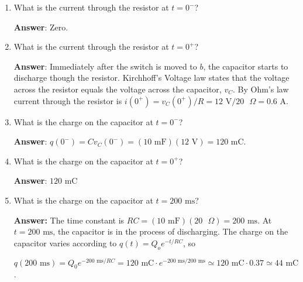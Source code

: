\documentclass{article}
\begin{document}
\begin{enumerate}

  \item What is the current through the resistor at $t=0^-$?

        \ifsolutions
        \textbf{Answer}: Zero.
        \else
        \vskip 56.25pt
        \fi
        \ifsolutions\else
        \vskip 56.25pt
        \fi

  \item What is the current through the resistor at $t=0^+$?

        \ifsolutions
        \textbf{Answer}: Immediately after the switch is moved to $b$, the capacitor starts to discharge though the resistor. Kirchhoff's Voltage law states that the voltage across the resistor equals the voltage across the capacitor, $v_C$. By Ohm's law current through the resistor is $i(0^+) = v_C(0^+)/R = 12\text{ V}/20\text{ }\Omega = 0.6\text{ A}$.
        \else
        \vskip 56.25pt
        \fi
        \ifsolutions\else
        \vskip 56.25pt
        \fi

  \item What is the charge on the capacitor at $t=0^-$?

        \ifsolutions
        \textbf{Answer}: $q(0^-) = Cv_C(0^-) = (10 \text{ mF})(12\text{ V}) = 120\text{ mC}$.
        \else
        \vskip 56.25pt
        \fi
        \ifsolutions\else
        \vskip 56.25pt
        \fi

  \item What is the charge on the capacitor at $t=0^+$?

        \ifsolutions
        \textbf{Answer}: $120\text{ mC}$
        \else
        \vskip 56.25pt
        \fi
        \ifsolutions\else
        \vskip 56.25pt
        \fi

  \item What is the charge on the capacitor at $t = 200\text{ ms}$?

        \ifsolutions
        {\bf Answer: } The time constant is $RC= (10\text{ mF}) (20\text{ }\Omega) = 200\text{ ms}$. At $t = 200\text{ ms}$, the capacitor is in the process of discharging. The charge on the capacitor varies according to $q(t)=Q_oe^{-t/RC}$, so

        $q(200\text{ ms}) = Q_0e^{-200\text{ ms}/RC} = 120\text{ mC} \cdot e^{-200\text{ ms}/200\text{ ms}} \simeq120\text{ mC}\cdot 0.37 \simeq 44 \text{ mC}$.
        \else
        \vskip 56.25pt
        \fi
        \ifsolutions\else
        \vskip 56.25pt
        \fi

\end{enumerate}
\end{document}
